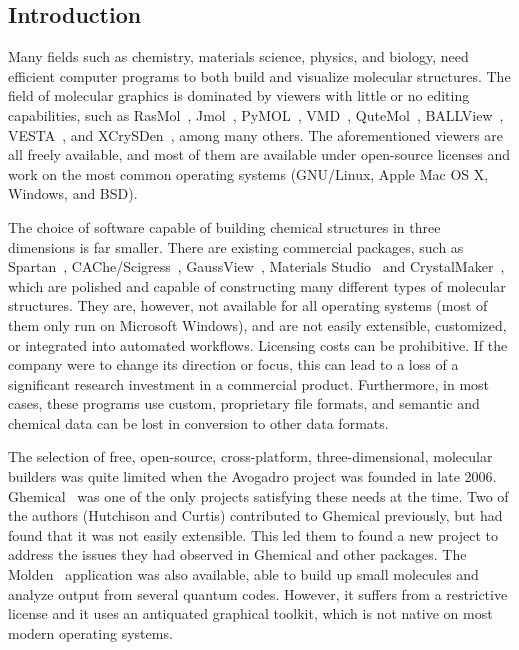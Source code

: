 \documentclass[10pt]{bmc_article}
\newenvironment{bmcformat}{\begin{raggedright}
\baselineskip20pt\sloppy\setboolean{publ}{false}}{\end{raggedright}
\baselineskip20pt\sloppy}
\begin{document}
\begin{bmcformat}
\begin{abstract}
\end{abstract}


\section{Introduction}

Many fields such as chemistry, materials science, physics, and biology, need
efficient computer programs to both build and visualize molecular structures.
The field of molecular graphics is dominated by viewers with little or no
editing capabilities, such as RasMol~\cite{RasMol}, Jmol~\cite{JMol},
PyMOL~\cite{PyMOL}, VMD~\cite{VMD}, QuteMol~\cite{QuteMol},
BALLView~\cite{BALLView}, VESTA~\cite{vesta3}, and
XCrySDen~\cite{xcrysden1}\cite{xcrysden2}, among many others. The aforementioned
viewers are all freely available, and most of them are available under
open-source licenses and work on the most common operating systems
(GNU/Linux, Apple Mac OS X, Windows, and BSD).

The choice of software capable of building chemical structures in
three dimensions is far smaller.
There are existing commercial packages, such as
Spartan~\cite{Spartan}, CAChe/Scigress~\cite{CAChe},
GaussView~\cite{GaussView}, Materials Studio~\cite{Accelrys} and
CrystalMaker~\cite{CrystalMaker}, which are polished and capable of
constructing many different types of molecular structures. They are,
however, not available for all operating systems (most of them only
run on Microsoft Windows), and are not easily extensible, customized,
or integrated into automated workflows. Licensing costs can be
prohibitive. If the company were to change its direction or focus, this
can lead to a loss of a significant research investment in a commercial
product. Furthermore, in most cases, these programs use custom,
proprietary file formats, and semantic and chemical data can be lost in
conversion to other data formats.

The selection of free, open-source, cross-platform, three-dimensional,
molecular builders was quite limited when the Avogadro project was founded in late 2006.
Ghemical~\cite{Ghemical} was one of the only projects satisfying these needs at
the time. Two of the authors (Hutchison and Curtis) contributed to Ghemical
previously, but had found that it was not easily extensible. This led them to
found a new project to address the issues they had observed in Ghemical
and other packages. The Molden~\cite{Molden} application was also available,
able to build up small molecules and analyze output from several quantum codes.
However, it suffers from a restrictive license and it uses an antiquated graphical
toolkit, which is not native on most modern operating systems.


\end{bmcformat}
\end{document}

